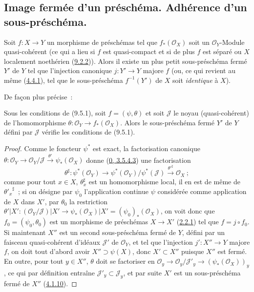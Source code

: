 \subsection{Image fermée d'un préschéma. Adhérence d'un sous-préschéma.}
\label{subsection:I.9.5-fr}

\begin{proposition}[9.5.1]
\label{I.9.5.1-fr}
Soit $f:X\to Y$ un morphisme de préschémas tel que $f_*(\mathscr{O}_X)$ soit
un $\mathscr{O}_Y$-Module quasi-cohérent (ce qui a lieu si $f$ est
quasi-compact et si de plus $f$ est séparé ou $X$ localement noethérien
(\hyperref[I.9.2.2-fr]{9.2.2})). Alors il existe un plus petit sous-préschéma fermé
$Y'$ de $Y$ tel que l'injection canonique $j:Y'\to Y$ majore $f$ (ou, ce qui
revient au même (\hyperref[I.4.4.1-fr]{4.4.1}), tel que le sous-préschéma
$f^{-1}(Y')$ de $X$ soit \emph{identique} à $X$).
\end{proposition}

De façon plus précise~:

\begin{corollary}[9.5.2]
\label{I.9.5.2-fr}
Sous les conditions de (9.5.1), soit $f=(\psi,\theta)$ et soit $\mathscr{J}$
le noyau (quasi-cohérent) de l'homomorphisme
$\theta:\mathscr{O}_Y\to f_*(\mathscr{O}_X)$. Alors le sous-préschéma fermé
$Y'$ de $Y$ défini par $\mathscr{J}$ vérifie les conditions de (9.5.1).
\end{corollary}

\begin{proof}
Comme le foncteur $\psi^*$ est exact, la factorisation canonique
$\theta:\mathscr{O}_Y\to\mathscr{O}_Y/\mathscr{J}
\xrightarrow{\theta'}\psi_*(\mathscr{O}_X)$ donne
(\hyperref[0.3.5.4.3-fr]{0, 3.5.4.3}) une factorisation
\[
  \theta^\sharp:\psi^*(\mathscr{O}_Y)
  \to\psi^*(\mathscr{O}_Y)/\psi^*(\mathscr{J})
  \xrightarrow{{\theta'}^\sharp}\mathscr{O}_X~;
\]
comme pour tout $x\in X$, $\theta_x^\sharp$ est un homomorphisme local, il
en est de même de ${\theta'_x}^\sharp$~; si on désigne par $\psi_0$
l'application continue $\psi$ considérée comme application de $X$ dans
$X'$, par $\theta_0$ la restriction
$\theta'|X':(\mathscr{O}_Y/\mathscr{J})|X'
\to\psi_*(\mathscr{O}_X)|X'=(\psi_0)_*(\mathscr{O}_X)$, on voit donc que
$f_0=(\psi_0,\theta_0)$ est un morphisme de préschémas $X\to X'$
(\hyperref[I.2.2.1-fr]{2.2.1}) tel que $f=j\circ f_0$. Si maintenant $X''$
est un second sous-préschéma fermé de $Y$, défini par un faisceau
quasi-cohérent d'idéaux $\mathscr{J}'$ de $\mathscr{O}_Y$, et tel que
l'injection $j':X''\to Y$ majore $f$, on doit tout d'abord avoir
$X''\supset\psi(X)$, donc $X'\subset X''$ puisque $X''$ est fermé. En outre,
pour tout $y\in X''$, $\theta$ doit se factoriser en
$\mathscr{O}_y\to\mathscr{O}_y/\mathscr{J}'_y
\to(\psi_*(\mathscr{O}_X))_y$, ce qui par définition entraîne
$\mathscr{J}'_y\subset\mathscr{J}_y$, et par suite $X'$ est un
sous-préschéma fermé de $X''$ (\hyperref[I.4.1.10-fr]{4.1.10}).
\end{proof}

